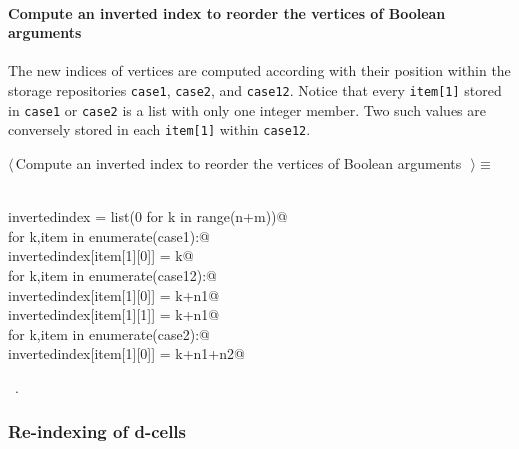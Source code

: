 \documentclass[11pt,oneside]{article}	%
\begin{document}
\paragraph{Compute an inverted index to reorder the vertices of Boolean arguments}
The new indices of vertices are computed according with their position within the storage repositories \texttt{case1}, \texttt{case2}, and \texttt{case12}. Notice that every \texttt{item[1]} stored in \texttt{case1} or \texttt{case2} is a list with only one integer member. Two such values are conversely stored in each \texttt{item[1]} within \texttt{case12}.
\begin{flushleft} \small \label{scrap7}
$\langle\,$Compute an inverted index to reorder the vertices of Boolean arguments\nobreak\ {\footnotesize {}}$\,\rangle\equiv$
\vspace{-1ex}
\begin{list}{}{} \item
\mbox{}\verb@@\\
\mbox{}\verb@   invertedindex = list(0 for k in range(n+m))@\\
\mbox{}\verb@   for k,item in enumerate(case1):@\\
\mbox{}\verb@      invertedindex[item[1][0]] = k@\\
\mbox{}\verb@   for k,item in enumerate(case12):@\\
\mbox{}\verb@      invertedindex[item[1][0]] = k+n1@\\
\mbox{}\verb@      invertedindex[item[1][1]] = k+n1@\\
\mbox{}\verb@   for k,item in enumerate(case2):@\\
\mbox{}\verb@      invertedindex[item[1][0]] = k+n1+n2@\\
\mbox{}\verb@@{\NWsep}
\end{list}
\vspace{-1ex}
\footnotesize\addtolength{\baselineskip}{-1ex}
\begin{list}{}{\setlength{\itemsep}{-\parsep}\setlength{\itemindent}{-\leftmargin}}
\item \NWtxtMacroRefIn\ .
\end{list}
\end{flushleft}

\subsubsection{Re-indexing of d-cells}
\end{document}
